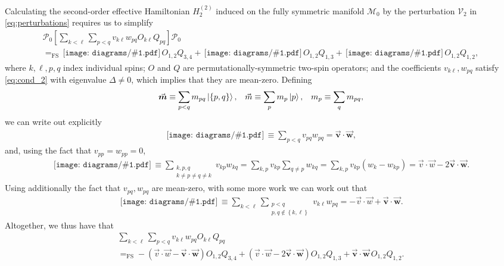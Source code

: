 \documentclass[nofootinbib,notitlepage,11pt]{revtex4-2}
\newcommand{\p}[1]{\left(#1\right)} %
\renewcommand{\sp}[1]{\left[#1\right]} %
\renewcommand{\set}[1]{\left\{#1\right\}} %
\renewcommand{\c}{\cdot} %
\newcommand{\m}{\bm} %
\renewcommand{\v}{\vec} %
\newcommand{\1}{\mathds{1}}
\newcommand{\M}{\mathcal{M}}
\renewcommand{\P}{\mathcal{P}}
\newcommand{\V}{\mathcal{V}}
\newcommand{\EQFS}{=_{\text{FS}}}
\newcommand{\diagram}[1]
{\,\texttt{[image: diagrams/\#1.pdf]}\,}
\begin{document}
Calculating the second-order effective Hamiltonian $H_2^{(2)}$ induced
on the fully symmetric manifold $\M_0$ by the perturbation $\V_2$ in
\eqref{eq:perturbations} requires us to simplify
\begin{multline}
  \P_0 \sp{\sum_{k<\ell} \sum_{p<q}
    v_{k\ell} w_{pq} O_{k\ell} Q_{pq}} \P_0 \\
  \EQFS \diagram{two_body_0} O_{1,2} Q_{3,4}
  + \diagram{two_body_1} O_{1,2} Q_{1,3}
  + \diagram{two_body_2} O_{1,2} Q_{1,2},
  \label{eq:POQP_start}
\end{multline}
where $k,\ell,p,q$ index individual spins; $O$ and $Q$ are
permutationally-symmetric two-spin operators; and the coefficients
$v_{k\ell},w_{pq}$ satisfy \eqref{eq:cond_2} with eigenvalue
$\Delta\ne0$, which implies that they are mean-zero.  Defining
\begin{align}
  \v{\m m} \equiv \sum_{p<q} m_{pq} \ket{\set{p,q}},
  &&
  \v m \equiv \sum_p m_p \ket{p},
  &&
  m_p \equiv \sum_q m_{pq},
\end{align}
we can write out explicitly
\begin{align}
  \diagram{two_body_2}
  \equiv \sum_{p<q} v_{pq} w_{pq} = \v{\m v} \c\v{\m w},
\end{align}
and, using the fact that $v_{pp}=w_{pp}=0$,
\begin{align}
  \diagram{two_body_1}
  \equiv \sum_{\substack{k,p,q\\k\ne p\ne q\ne k}} v_{kp} w_{kq}
  = \sum_{k,p} v_{kp} \sum_{q\ne p} w_{kq}
  = \sum_{k,p} v_{kp} \p{w_{k} - w_{kp}}
  = \v v \c \v w - 2 \v{\m v} \c \v{\m w}.
\end{align}
Using additionally the fact that $v_{pq},w_{pq}$ are mean-zero, with
some more work we can work out that
\begin{align}
  \diagram{two_body_0}
  \equiv \sum_{k<\ell} \sum_{\substack{p<q\\p,q\notin\set{k,\ell}}}
  v_{k\ell} w_{pq} = -\v v \c \v w + \v{\m v} \c \v{\m w}.
\end{align}
Altogether, we thus have that
\begin{multline}
  \sum_{k<\ell} \sum_{p<q} v_{k\ell} w_{pq} O_{k\ell} Q_{pq} \\
  \EQFS - \p{\v v \c \v w - \v{\m v} \c \v{\m w}} O_{1,2} Q_{3,4}
  + \p{\v v\c\v w - 2 \v{\m v} \c \v{\m w}} O_{1,2} Q_{1,3}
  + \v{\m v} \c \v{\m w}\, O_{1,2} Q_{1,2}.
  \label{eq:POQP}
\end{multline}

\end{document}
